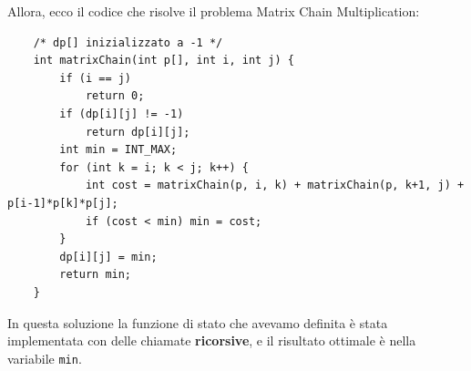 \vspace{0.5cm}

\noindent Allora, ecco il codice che risolve il problema Matrix Chain Multiplication:
\begin{verbatim}
    /* dp[] inizializzato a -1 */
    int matrixChain(int p[], int i, int j) {
        if (i == j)
            return 0;
        if (dp[i][j] != -1)
            return dp[i][j];
        int min = INT_MAX;
        for (int k = i; k < j; k++) {
            int cost = matrixChain(p, i, k) + matrixChain(p, k+1, j) + p[i-1]*p[k]*p[j];
            if (cost < min) min = cost;
        }
        dp[i][j] = min;
        return min;
    }
\end{verbatim}

\noindent In questa soluzione la funzione di stato che avevamo definita è stata implementata con delle chiamate \textbf{ricorsive}, e il risultato ottimale è 
nella variabile \texttt{min}.



